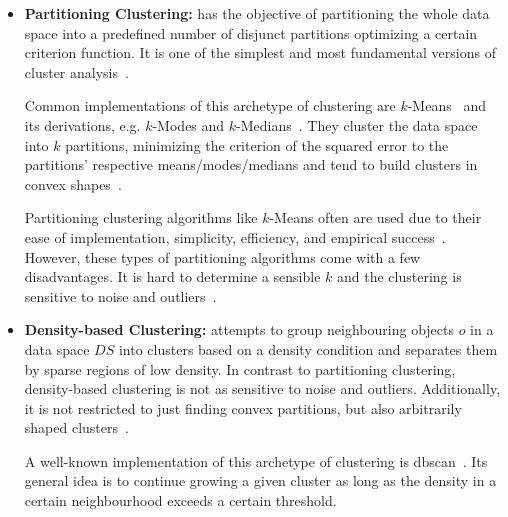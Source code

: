 \begin{itemize}
    \item \textbf{Partitioning Clustering:} has the objective of partitioning the whole data space into a predefined number of disjunct partitions optimizing a certain criterion function. It is one of the simplest and most fundamental versions of cluster analysis~\cite[Ch.10.2]{han2011data}.
    
    Common implementations of this archetype of clustering are \linebreak $k$-Means~\cite{kmeansmacqueen1967some} and its derivations, e.g. $k$-Modes and $k$-Medians~\cite{kmeanshalfcenturysteinley2006k}. They cluster the data space into $k$ partitions, minimizing the criterion of the squared error to the partitions' respective means/modes/medians and tend to build clusters in convex shapes~\cite{clusteringsurveyberkhin2006survey}. 
    
    Partitioning clustering algorithms like $k$-Means often are used due to their ease of implementation, simplicity, efficiency, and empirical success~\cite{kmeans50jain2010data}.
    However, these types of partitioning algorithms come with a few disadvantages. It is hard to determine a sensible $k$ and the clustering is sensitive to noise and outliers~\cite{dataclusteringreviewjain1999data}. 
    
    \item \textbf{Density-based Clustering:} attempts to group neighbouring objects $o$ in a data space $DS$ into clusters based on a density condition and separates them by sparse regions of low density. In contrast to partitioning clustering, density-based clustering is not as sensitive to noise and outliers. Additionally, it is not restricted to just finding convex partitions, but also arbitrarily shaped clusters~\cite[Ch.10.4]{han2011data}.
    
    A well-known implementation of this archetype of clustering is \acrshort{dbscan}~\cite{DBSCANEKSX96}. Its general idea is to continue growing a given cluster as long as the density in a certain neighbourhood exceeds a certain threshold. 
    

\end{itemize}
